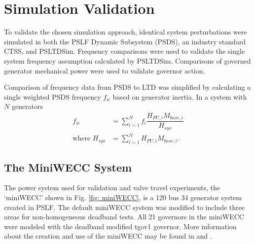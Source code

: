\section{Simulation Validation}
To validate the chosen simulation approach, identical system perturbations were simulated in both the PSLF Dynamic Subsystem (PSDS), an industry standard CTSS, and PSLTDSim.
Frequency comparisons were used to validate the single system frequency assumption calculated by PSLTDSim.
Comparisons of governed generator mechanical power were used to validate governor action.

Comparison of frequency data from PSDS to LTD was simplified by calculating a single weighted PSDS frequency $f_w$ based on generator inertia. 
In a system with $N$ generators
\begin{align}
f_{w} &= \sum_{i=1}^{N} f_i \dfrac{H_{PU, i} M_{base, i} }{H_{sys}}  \label{eq: f_weighted}\\
\text{where } H_{sys} &= \sum_{i=1}^{N} H_{PU, i} M_{base, i}.  \label{eq: Hsys}
\end{align}


\subsection{The MiniWECC System}

The power system used for validation and valve travel experiments, the `miniWECC' shown in Fig. \ref{fig: miniWECC}, is a 120 bus 34 generator system created in PSLF.
The default miniWECC system was modified to include three areas for non-homogeneous deadband tests.
All 21 governors in the miniWECC were modeled with the deadband modified tgov1 governor.%
More information about the creation and use of the miniWECC may be found in \cite{trudnowski2012} and \cite{sandia2015}.

